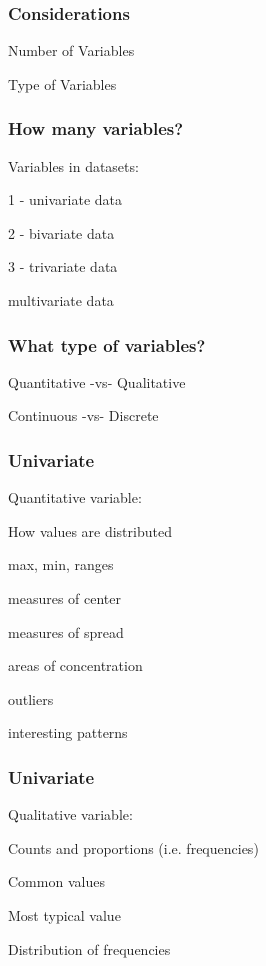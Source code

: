 \documentclass[12pt]{beamer}\usepackage[]{graphicx}\usepackage[]{color}
\begin{document}

\begin{frame}
\frametitle{Considerations}

\centerline{\mdlit \large Number of Variables}

\bigskip
\centerline{\Large \large Type of Variables}

\end{frame}


\begin{frame}
\frametitle{How many variables?}

Variables in datasets:
\bi
  \item 1 - univariate data
  \item 2 - bivariate data
  \item 3 - trivariate data
  \item multivariate data
\ei

\end{frame}


\begin{frame}
\frametitle{What type of variables?}

\bbi
  \item Quantitative -vs- Qualitative
  \item Continuous -vs- Discrete
\ei

\end{frame}


\begin{frame}
\frametitle{Univariate}

Quantitative variable:
\bi
  \item How values are distributed
  \item max, min, ranges
  \item measures of center
  \item measures of spread
  \item areas of concentration
  \item outliers
  \item interesting patterns
\ei

\end{frame}


\begin{frame}
\frametitle{Univariate}

Qualitative variable:
\bi
  \item Counts and proportions (i.e. frequencies)
  \item Common values
  \item Most typical value
  \item Distribution of frequencies
\ei

\end{frame}
\end{document}
